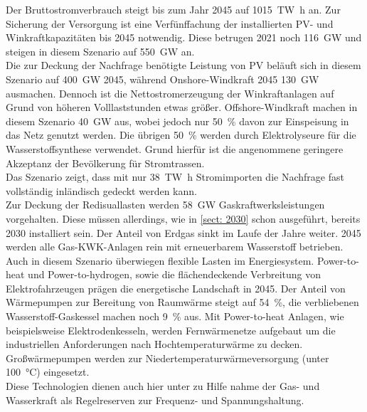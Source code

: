		Der Bruttostromverbrauch steigt bis zum Jahr 2045 auf \SI{1015}{\tera \watt \hour} an.\cite[S.10]{ESRa_Fraunhofer} Zur Sicherung der Versorgung ist eine Verfünffachung der installierten PV- und Winkraftkapazitäten bis 2045 notwendig. Diese betrugen 2021 noch \SI{116}{\giga \watt} und steigen in diesem Szenario auf \SI{550}{\giga \watt} an.\cite[S.7]{ESRa_Fraunhofer}\\
		Die zur Deckung der Nachfrage benötigte Leistung von PV beläuft sich in diesem Szenario auf \SI{400}{\giga \watt} 2045, während Onshore-Windkraft 2045 \SI{130}{\giga \watt} ausmachen. Dennoch ist die Nettostromerzeugung der Winkraftanlagen auf Grund von höheren Volllaststunden etwas größer.\cite[S.7]{ESRa_Fraunhofer} Offshore-Windkraft machen in diesem Szenario \SI{40}{\giga \watt} aus, wobei jedoch nur \SI{50}{\percent} davon zur Einspeisung in das Netz genutzt werden. Die übrigen \SI{50}{\percent} werden durch Elektrolyseure für die Wasserstoffsynthese verwendet. Grund hierfür ist die angenommene geringere Akzeptanz der Bevölkerung für Stromtrassen.\cite[S.7]{ESRa_Fraunhofer}\\
		Das Szenario zeigt, dass mit nur \SI{38}{\tera \watt \hour} Stromimporten die Nachfrage fast vollständig inländisch gedeckt werden kann.\cite[S.16]{ESRa_Fraunhofer}\\
		
		Zur Deckung der Redisuallasten werden \SI{58}{\giga \watt} Gaskraftwerksleistungen vorgehalten. Diese müssen allerdings, wie in \ref{sect: 2030} schon ausgeführt, bereits 2030 installiert sein. Der Anteil von Erdgas sinkt im Laufe der Jahre weiter. 2045 werden alle Gas-KWK-Anlagen rein mit erneuerbarem Wasserstoff betrieben.\cite[S.8]{ESRa_Fraunhofer}\\
		
		Auch in diesem Szenario überwiegen flexible Lasten im Energiesystem. Power-to-heat und Power-to-hydrogen, sowie die flächendeckende Verbreitung von Elektrofahrzeugen prägen die energetische Landschaft in 2045. Der Anteil von Wärmepumpen zur Bereitung von Raumwärme steigt auf \SI{54}{\percent}, die verbliebenen Wasserstoff-Gaskessel machen noch \SI{9}{\percent} aus. Mit Power-to-heat Anlagen, wie beispielsweise Elektrodenkesseln, werden Fernwärmenetze aufgebaut um die industriellen Anforderungen nach Hochtemperaturwärme zu decken. Großwärmepumpen werden zur Niedertemperaturwärmeversorgung (unter \SI{100}{\degreeCelsius}) eingesetzt.\cite[S.10ff]{ESRa_Fraunhofer}\\ Diese Technologien dienen auch hier unter zu Hilfe nahme der Gas- und Wasserkraft als Regelreserven zur Frequenz- und Spannungshaltung.
		
